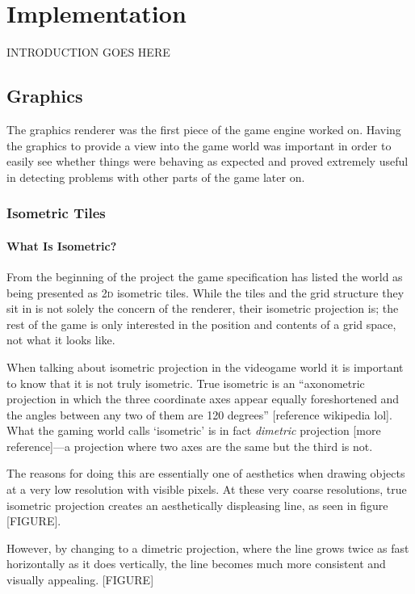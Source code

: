 \chapter{Implementation}

INTRODUCTION GOES HERE

\section{Graphics}
The graphics renderer was the first piece of the game engine worked on. Having the graphics to provide a view into the game world was important in order to easily see whether things were behaving as expected and proved extremely useful in detecting problems with other parts of the game later on.

\subsection{Isometric Tiles}

\subsubsection{What Is Isometric?}
From the beginning of the project the game specification has listed the world as being presented as \textsc{2d} isometric tiles. While the tiles and the grid structure they sit in is not solely the concern of the renderer, their isometric projection is; the rest of the game is only interested in the position and contents of a grid space, not what it looks like.

When talking about isometric projection in the videogame world it is important to know that it is not truly isometric. True isometric is an ``axonometric projection in which the three coordinate axes appear equally foreshortened and the angles between any two of them are 120 degrees'' [reference wikipedia lol]. What the gaming world calls `isometric' is in fact \textit{dimetric} projection [more reference]---a projection where two axes are the same but the third is not.

The reasons for doing this are essentially one of aesthetics when drawing objects at a very low resolution with visible pixels. At these very coarse resolutions, true isometric projection creates an aesthetically displeasing line, as seen in figure [FIGURE].

However, by changing to a dimetric projection, where the line grows twice as fast horizontally as it does vertically, the line becomes much more consistent and visually appealing. [FIGURE]

